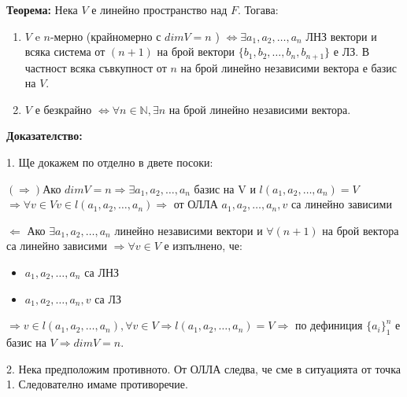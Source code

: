 \documentclass[fleqn,12pt]{article}
\begin{document}
\begin{flushleft}
    \vspace{5mm}
    
    \textbf{Теорема:} Нека $V$ е линейно пространство над $F$. Тогава:
    \begin{enumerate}
        \item $V$ e $n$-мерно (крайномерно с $dimV = n$ ) $\iff$$ \exists a_1, a_2, \dots, a_n $ ЛНЗ вектори и всяка система от $(n+1)$ на брой вектори $\{b_1, b_2, \dots, b_n, b_{n+1}\}$ е ЛЗ. В частност всяка съвкупност от $n$ на брой линейно независими вектора е базис на $V$.
        \item $V$ е безкрайно $ \iff  \forall n \in \mathbb{N}, \exists n $ на брой линейно независими вектора.
    \end{enumerate}

    \vspace{5mm}
    
        \textbf{Доказателство:}

        1. Ще докажем по отделно в двете посоки:
            
        \vspace{5mm}
        
        $(\Rightarrow) $Ако $dimV = n \Rightarrow \exists a_1, a_2, \dots, a_n $ базис на V и $l(a_1, a_2, \dots, a_n) = V$ $\Rightarrow \forall v \in V v \in l(a_1, a_2, \dots, a_n) \Rightarrow $ от ОЛЛА $ a_1, a_2, \dots, a_n, v $ са линейно зависими 

        \vspace{5mm}
    
        $\Leftarrow $ Ако $ \exists a_1, a_2, \dots, a_n $ линейно независими вектори и $ \forall (n + 1) $ на брой вектора са линейно зависими $\Rightarrow \forall v \in V $ е изпълнено, че:
        \begin{itemize}
            \item $a_1, a_2, \dots, a_n $ са ЛНЗ
            \item $a_1, a_2, \dots, a_n, v $ са  ЛЗ
        \end{itemize}
            
        $\Rightarrow v \in l(a_1, a_2, \dots, a_n), \forall v \in V \Rightarrow l(a_1, a_2, \dots, a_n) = V \Rightarrow $ по дефиниция $ \{a_i\}_1^n $ е базис на $V \Rightarrow dimV = n$. 

        \vspace{5mm}
    
        2. Нека предположим противното. От ОЛЛА следва, че сме в ситуацията от точка 1. Следователно имаме противоречие. \square
        

\end{flushleft}
\end{document}
